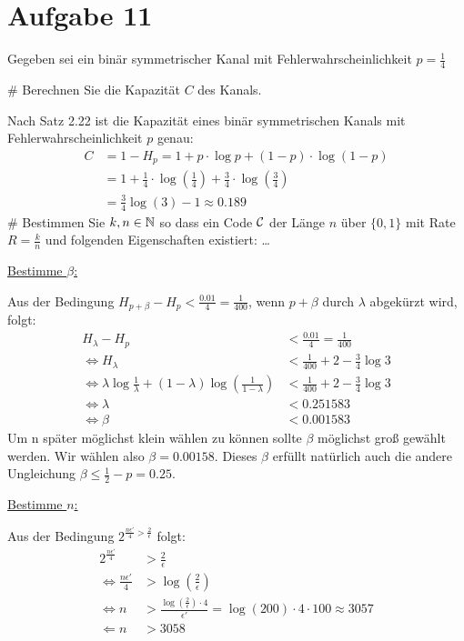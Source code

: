 
\setcounter{MaxMatrixCols}{20}

\section*{Aufgabe 11}
Gegeben sei ein binär symmetrischer Kanal mit Fehlerwahrscheinlichkeit $p = \frac{1}{4}$
\begin{myList}
#
Berechnen Sie die Kapazität $C$ des Kanals.

Nach Satz 2.22 ist die Kapazität eines binär symmetrischen Kanals mit Fehlerwahrscheinlichkeit $p$ genau:
\begin{align*}
	C &= 1 - H_p = 1 + p \cdot \log p + (1-p)\cdot \log (1-p) \\
	&= 1 + \frac{1}{4} \cdot \log \left(\frac{1}{4}\right) + \frac{3}{4}\cdot \log \left(\frac{3}{4}\right) \\
	&= \frac{3}{4} \log(3) - 1 \approx  0.189
\end{align*} 
#
Bestimmen Sie $k,n \in \mathbb{N}$ so dass ein Code $\mathcal{C}$ der Länge $n$ über $\lbrace 0,1 \rbrace$ mit Rate $R = \frac{k}{n}$ und folgenden Eigenschaften existiert: \ldots

\underline{Bestimme $\beta$:}

Aus der Bedingung $ H_{p+\beta} - H_{p} < \frac{0.01}{4} = \frac{1}{400 }$, wenn $p + \beta$ durch $\lambda$ abgekürzt wird, folgt:
\begin{align*}
	H_\lambda - H_p &< \frac{0.01}{4} = \frac{1}{400} \\
	\Leftrightarrow H_\lambda &< \frac{1}{400} + 2 - \frac{3}{4}\log 3 \\
	\Leftrightarrow \lambda \log \frac{1}{\lambda} + (1-\lambda) \log(\frac{1}{1-\lambda}) &< \frac{1}{400} + 2 - \frac{3}{4}\log 3 \\
	\Leftrightarrow \lambda &< 0.251583 \\
	\Leftrightarrow \beta &< 0.001583
\end{align*}
Um n später möglichst klein wählen zu können sollte $\beta$ möglichst groß gewählt werden.
Wir wählen also $\beta = 0.00158$.
Dieses $\beta$ erfüllt natürlich auch die andere Ungleichung $\beta \leq \frac{1}{2} - p = 0.25$.

\underline{Bestimme $n$:}

Aus der Bedingung $2^{\frac{n \epsilon'}{4} > \frac{2}{\epsilon}}$ folgt:
\begin{align*}
	2^{\frac{n \epsilon'}{4}} &> \frac{2}{\epsilon} \\
	\Leftrightarrow \frac{n \epsilon'}{4} &> \log \left( \frac{2}{\epsilon}\right)\\
	\Leftrightarrow n &> \frac{\log\left( \frac{2}{\epsilon}\right) \cdot 4}{\epsilon'} = \log(200) \cdot 4 \cdot 100 \approx 3057 \\
	\Leftarrow n &> 3058
\end{align*}


\end{myList}
